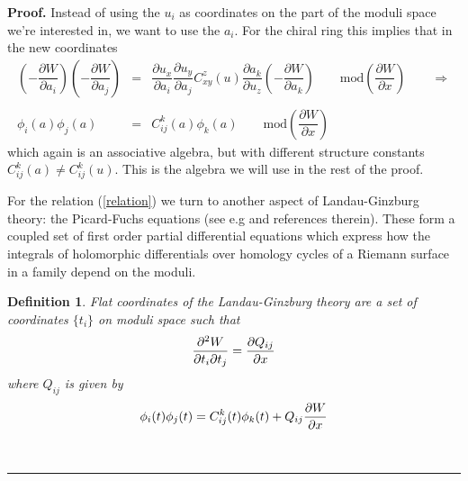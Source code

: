 \documentclass[a4paper,11pt]{article}
\newtheorem{definition}[theorem]{Definition}
\newenvironment{proof}[1][Proof]{\textbf{#1.} }{\ \rule{0.5em}{0.5em}}
\numberwithin{equation}{section}
\begin{document}
\begin{proof}
\noindent Instead of using the $u_{i}$ as coordinates on the part of
the moduli space we're interested in, we
want to use the $a_{i}$. For the chiral ring this implies that in the new
coordinates 
\begin{eqnarray}
(-\dfrac{\partial W}{\partial a_{i}})(-\dfrac{\partial W}{\partial a_{j}}) & 
= & \dfrac{\partial u_{x}}{\partial a_{i}}\dfrac{\partial u_{y}}{\partial
a_{j}}C_{xy}^{z}(u)\dfrac{\partial a_{k}}{\partial u_{z}}(-\dfrac{\partial W%
}{\partial a_{k}})\qquad \mbox{mod}(\dfrac{\partial W}{\partial x})
\qquad \Longrightarrow \nonumber \\ \nonumber \\
\phi _{i}(a)\phi _{j}(a) & = & C_{ij}^{k}(a)\phi _{k}(a)\qquad \mbox{mod}(%
\dfrac{\partial W}{\partial x})
\end{eqnarray}
which again is an associative algebra, but with different structure
constants $C_{ij}^{k}(a)\neq C_{ij}^{k}(u)$. This is the algebra we will use
in the rest of the proof.\newline

\noindent For the relation (\ref{relation}) we turn to another aspect of
Landau-Ginzburg theory: the Picard-Fuchs equations (see e.g \cite
{LERC-SMIT-WARN:1992} and references therein). These form a coupled set of
first order partial differential equations which express how the integrals
of holomorphic differentials over homology cycles of a Riemann surface in a
family depend on the moduli.

\begin{definition}
Flat coordinates of the Landau-Ginzburg theory are a set of coordinates $%
\{t_{i}\}$ on moduli space such that 
\begin{equation}
\dfrac{\partial ^{2}W}{\partial t_{i}\partial t_{j}}=\dfrac{\partial Q_{ij}}{%
\partial x}
\end{equation}
where $Q_{ij}$ is given by 
\begin{equation}
\phi _{i}(t)\phi _{j}(t)=C_{ij}^{k}(t)\phi _{k}(t)+Q_{ij}\dfrac{\partial W}{%
\partial x}
\end{equation}
\end{definition}


\end{proof}
\end{document}
